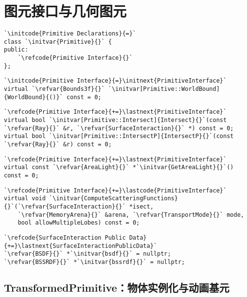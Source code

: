 \section{图元接口与几何图元}\label{sec:图元接口与几何图元}

\begin{lstlisting}
`\initcode{Primitive Declarations}{=}`
class `\initvar{Primitive}{}` {
public:
    `\refcode{Primitive Interface}{}`
};
\end{lstlisting}

\begin{lstlisting}
`\initcode{Primitive Interface}{=}\initnext{PrimitiveInterface}`
virtual `\refvar{Bounds3f}{}` `\initvar[Primitive::WorldBound]{WorldBound}{()}` const = 0;
\end{lstlisting}

\begin{lstlisting}
`\refcode{Primitive Interface}{+=}\lastnext{PrimitiveInterface}`
virtual bool `\initvar[Primitive::Intersect]{Intersect}{}`(const `\refvar{Ray}{}` &r, `\refvar{SurfaceInteraction}{}` *) const = 0;
virtual bool `\initvar[Primitive::IntersectP]{IntersectP}{}`(const `\refvar{Ray}{}` &r) const = 0;
\end{lstlisting}

\begin{lstlisting}
`\refcode{Primitive Interface}{+=}\lastnext{PrimitiveInterface}`
virtual const `\refvar{AreaLight}{}` *`\initvar{GetAreaLight}{}`() const = 0;
\end{lstlisting}

\begin{lstlisting}
`\refcode{Primitive Interface}{+=}\lastcode{PrimitiveInterface}`
virtual void `\initvar{ComputeScatteringFunctions}{}`(`\refvar{SurfaceInteraction}{}` *isect,
    `\refvar{MemoryArena}{}` &arena, `\refvar{TransportMode}{}` mode,
    bool allowMultipleLobes) const = 0;
\end{lstlisting}

\begin{lstlisting}
`\refcode{SurfaceInteraction Public Data}{+=}\lastnext{SurfaceInteractionPublicData}`
`\refvar{BSDF}{}` *`\initvar{bsdf}{}` = nullptr;
`\refvar{BSSRDF}{}` *`\initvar{bssrdf}{}` = nullptr;
\end{lstlisting}

\subsection{TransformedPrimitive：物体实例化与动画基元}\label{sub:TransformedPrimitive：物体实例化与动画基元}
